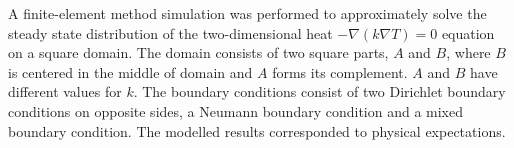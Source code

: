 A finite-element method simulation was performed to approximately solve the steady state distribution of the  two-dimensional heat $-\nabla (k\nabla T) = 0$ equation on a square domain. The domain consists of two square parts, $A$ and $B$, where $B$ is centered in the middle of domain and $A$ forms its complement. $A$ and $B$ have different values for $k$. The boundary conditions consist of two Dirichlet boundary conditions on opposite sides, a Neumann boundary condition and a mixed boundary condition. The modelled results corresponded to physical expectations.
